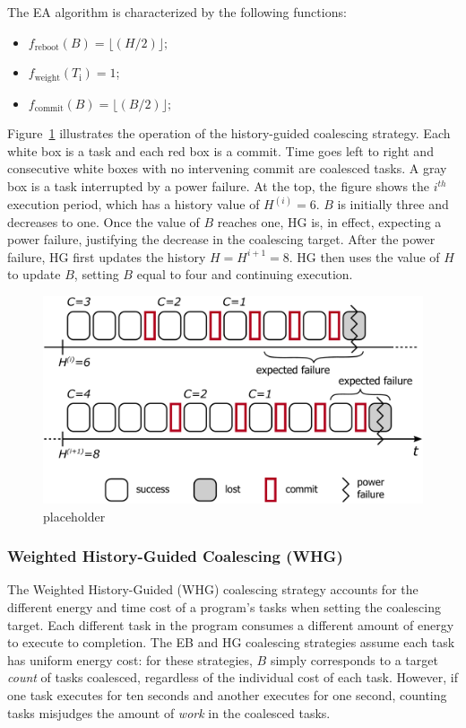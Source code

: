 The EA algorithm is characterized by the following functions: 

\begin{itemize}
\item $f_\text{reboot}(B) = \lfloor(H / 2)\rfloor;$
\item $f_\text{weight}(T_\text{i}) =  1$; 
\item $f_\text{commit}(B) = \lfloor(B / 2)\rfloor;$ 
\end{itemize}


Figure~\ref{fig:energyAware} illustrates the operation of the history-guided
coalescing strategy.  Each white box is a task and each red box is a commit.
Time goes left to right and consecutive white boxes with no intervening commit
are coalesced tasks.  A gray box is a task interrupted by a power failure.  At
the top, the figure shows the $i^{th}$ execution period, which has a history
value of $H^{(i)} = 6$.  $B$ is initially three and decreases to one.  Once the
value of $B$ reaches one, HG is, in effect, expecting a power failure,
justifying the decrease in the coalescing target.  After the power failure, HG
first updates the history $H = H^{i+1} = 8$.  HG then uses the value of $H$ to
update $B$, setting $B$ equal to four and continuing execution.  


\begin{figure}
	\centering
	\includegraphics[width=0.5\columnwidth]{figures/energy-aware-coal.pdf}
	\caption{placeholder}
	\label{fig:energyAware}
\end{figure}


\subsubsection{Weighted History-Guided Coalescing (WHG)}
\label{subsec:energyTaskAware}

The Weighted History-Guided (WHG) coalescing strategy accounts for the
different energy and time cost of a program's tasks when setting the coalescing
target.
%
Each different task in the program consumes a different amount of energy to
execute to completion.  
%
The EB and HG coalescing strategies assume each task has uniform energy cost:
for these strategies, $B$ simply corresponds to a target {\em count} of tasks
coalesced, regardless of the individual cost of each task.
%
However, if one task executes for ten seconds and another executes for one
second, counting tasks misjudges the amount of {\em work} in the coalesced
tasks.


